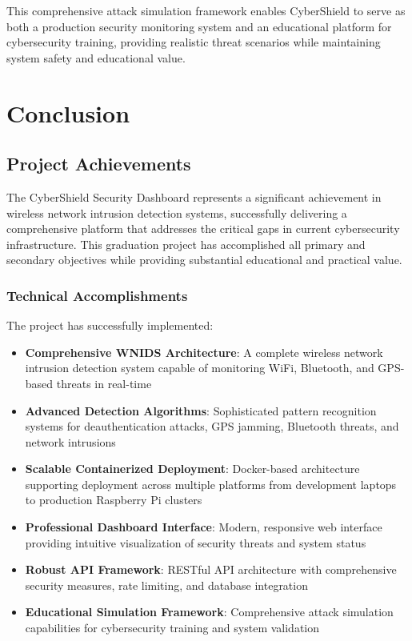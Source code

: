 \documentclass[12pt,a4paper]{report}
\begin{document}
This comprehensive attack simulation framework enables CyberShield to serve as both a production security monitoring system and an educational platform for cybersecurity training, providing realistic threat scenarios while maintaining system safety and educational value.

\chapter{Conclusion}

\section{Project Achievements}

The CyberShield Security Dashboard represents a significant achievement in wireless network intrusion detection systems, successfully delivering a comprehensive platform that addresses the critical gaps in current cybersecurity infrastructure. This graduation project has accomplished all primary and secondary objectives while providing substantial educational and practical value.

\subsection{Technical Accomplishments}

The project has successfully implemented:

\begin{itemize}
    \item \textbf{Comprehensive WNIDS Architecture}: A complete wireless network intrusion detection system capable of monitoring WiFi, Bluetooth, and GPS-based threats in real-time
    \item \textbf{Advanced Detection Algorithms}: Sophisticated pattern recognition systems for deauthentication attacks, GPS jamming, Bluetooth threats, and network intrusions
    \item \textbf{Scalable Containerized Deployment}: Docker-based architecture supporting deployment across multiple platforms from development laptops to production Raspberry Pi clusters
    \item \textbf{Professional Dashboard Interface}: Modern, responsive web interface providing intuitive visualization of security threats and system status
    \item \textbf{Robust API Framework}: RESTful API architecture with comprehensive security measures, rate limiting, and database integration
    \item \textbf{Educational Simulation Framework}: Comprehensive attack simulation capabilities for cybersecurity training and system validation
\end{itemize}
\end{document}
